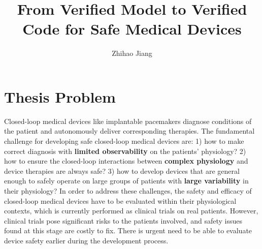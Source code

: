 \documentclass[a4paper]{article}
\title{From Verified Model to Verified Code for Safe Medical Devices}
\author{Zhihao Jiang}
\begin{document}
\maketitle


\section*{Thesis Problem}
Closed-loop medical devices like implantable pacemakers diagnose conditions of the patient and autonomously deliver corresponding therapies.
The fundamental challenge for developing safe closed-loop medical devices are: 
1) how to make correct diagnosis with \textbf{limited observability} on the patients' physiology? 
2) how to ensure the closed-loop interactions between \textbf{complex physiology} and device therapies are always safe?
3) how to develop devices that are general enough to safely operate on large groups of patients with \textbf{large variability} in their physiology?
In order to address these challenges, the safety and efficacy of closed-loop medical devices have to be evaluated within their physiological contexts, which is currently performed as clinical trials on real patients.
However, clinical trials pose significant risks to the patients involved, and safety issues found at this stage are costly to fix. 
There is urgent need to be able to evaluate device safety earlier during the development process.
\end{document}
